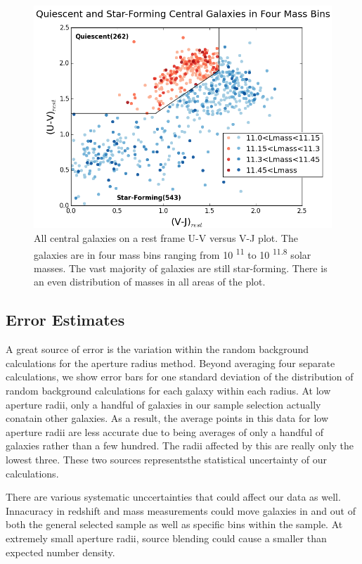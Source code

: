 \documentclass[apj]{emulateapj}
\begin{document}
\begin{figure}
\centering
\graphicspath{{C:/3d_hst/2015_finals/Colors/}}
\includegraphics[width=\linewidth]{temp_color_final}
\caption{\footnotesize All central galaxies on a rest frame U-V versus V-J plot. The galaxies are in four mass bins ranging from 10 \textsuperscript{11} to 10 \textsuperscript{11.8} solar masses. The vast majority of galaxies are still star-forming. There is an even distribution of masses in all areas of the plot.}
\label{fig:color}
\end{figure}

\subsection{Error Estimates}

A great source of error is the variation within the random background calculations for the aperture radius method. Beyond averaging four separate calculations, we show error bars for one standard deviation of the distribution of random background calculations for each galaxy within each radius. At low aperture radii, only a handful of galaxies in our sample selection actually conatain other galaxies. As a result, the average points in this data for low aperture radii are less accurate due to being averages of only a handful of galaxies rather than a few hundred. The radii affected by this are really only the lowest three. These two sources representsthe statistical uncertainty of our calculations.

There are various systematic unccertainties that could affect our data as well. Innacuracy in redshift and mass measurements could move galaxies in and out of both the general selected sample as well as specific bins within the sample. At extremely small aperture radii, source blending could cause a smaller than expected number density. 
\end{document}
